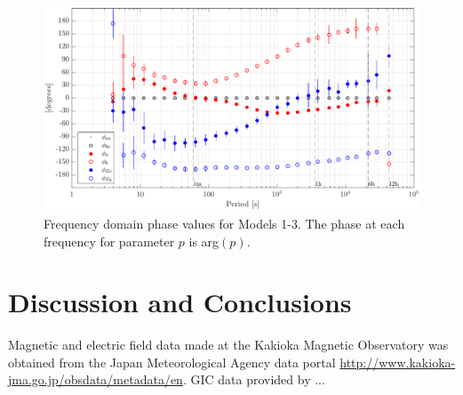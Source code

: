 \documentclass[draft,linenumbers]{agujournal2018}
\begin{document}
\begin{figure}[h]
\centering
\includegraphics[width=\textwidth]{figures/plot_TF_aves_Phi-options-1.pdf}
\caption{Frequency domain phase values for Models 1-3. The phase at each frequency for parameter $p$ is arg$(p)$.}
\label{Phi}
\end{figure}

\section{Discussion and Conclusions}


\acknowledgments
Magnetic and electric field data made at the Kakioka Magnetic Observatory was obtained from the Japan Meteorological Agency data portal \url{http://www.kakioka-jma.go.jp/obsdata/metadata/en}. GIC data provided by ...






\end{document}
